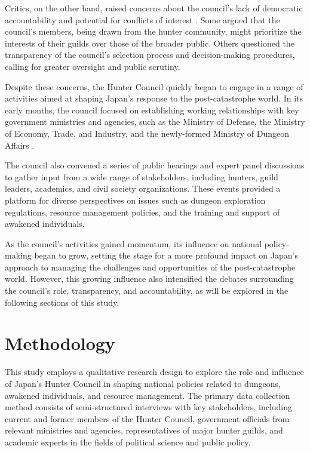 \documentclass[12pt, a4paper]{article}
\begin{document}
Critics, on the other hand, raised concerns about the council's lack of democratic accountability and potential for conflicts of interest \citep{nakamura2027rise}. Some argued that the council's members, being drawn from the hunter community, might prioritize the interests of their guilds over those of the broader public. Others questioned the transparency of the council's selection process and decision-making procedures, calling for greater oversight and public scrutiny.

Despite these concerns, the Hunter Council quickly began to engage in a range of activities aimed at shaping Japan's response to the post-catastrophe world. In its early months, the council focused on establishing working relationships with key government ministries and agencies, such as the Ministry of Defense, the Ministry of Economy, Trade, and Industry, and the newly-formed Ministry of Dungeon Affairs \citep{ishikawa2026japan}.

The council also convened a series of public hearings and expert panel discussions to gather input from a wide range of stakeholders, including hunters, guild leaders, academics, and civil society organizations. These events provided a platform for diverse perspectives on issues such as dungeon exploration regulations, resource management policies, and the training and support of awakened individuals.

As the council's activities gained momentum, its influence on national policy-making began to grow, setting the stage for a more profound impact on Japan's approach to managing the challenges and opportunities of the post-catastrophe world. However, this growing influence also intensified the debates surrounding the council's role, transparency, and accountability, as will be explored in the following sections of this study.

\section{Methodology}
This study employs a qualitative research design to explore the role and influence of Japan's Hunter Council in shaping national policies related to dungeons, awakened individuals, and resource management. The primary data collection method consists of semi-structured interviews with key stakeholders, including current and former members of the Hunter Council, government officials from relevant ministries and agencies, representatives of major hunter guilds, and academic experts in the fields of political science and public policy.
\end{document}
